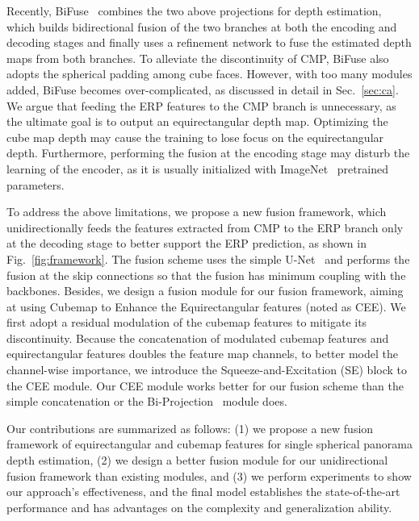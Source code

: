 \documentclass[letterpaper, 10 pt, conference]{ieeeconf}
\begin{document}
Recently, BiFuse~\cite{wang2020bifuse} combines the two above projections for depth estimation, which builds bidirectional fusion of the two branches at both the encoding and decoding stages and finally uses a refinement network to fuse the estimated depth maps from both branches. To alleviate the discontinuity of CMP, BiFuse also adopts the spherical padding among cube faces. However, with too many modules added, BiFuse becomes over-complicated, as discussed in detail in Sec.~\ref{sec:ca}. We argue that feeding the ERP features to the CMP branch is unnecessary, as the ultimate goal is to output an equirectangular depth map.
Optimizing the cube map depth may cause the training to lose focus on the equirectangular depth. Furthermore, performing the fusion at the encoding stage may disturb the learning of the encoder, as it is usually initialized with ImageNet~\cite{deng2009imagenet} pretrained parameters. 


To address the above limitations, we propose a new fusion framework, which unidirectionally feeds the features extracted from CMP to the ERP branch only at the decoding stage to better support the ERP  prediction, as shown in Fig.~\ref{fig:framework}. The fusion scheme uses the simple U-Net~\cite{ronneberger2015u} and performs the fusion at the skip connections so that the fusion has minimum coupling with the backbones.
Besides, we design a fusion module for our fusion framework, aiming at using Cubemap to Enhance the Equirectangular features (noted as CEE). We first adopt a residual modulation of the cubemap features to mitigate its discontinuity. Because the concatenation of modulated cubemap features and equirectangular features doubles the feature map channels, to better model the channel-wise importance, we introduce the Squeeze-and-Excitation (SE) \cite{hu2018squeeze} block to the CEE module. Our CEE module works better for our fusion scheme than the simple concatenation or the Bi-Projection~\cite{wang2020bifuse} module does.


Our contributions are summarized as follows: 
(1) we propose a new fusion framework of equirectangular and cubemap features for single spherical panorama depth estimation, 
(2) we design a better fusion module for our unidirectional fusion framework than existing modules, 
and (3) we perform experiments to show our approach's effectiveness, and the final model establishes the state-of-the-art performance and has advantages on the complexity and generalization ability. 
\end{document}
